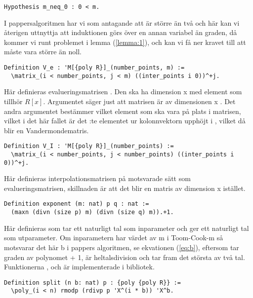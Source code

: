 \begin{lstlisting}
Hypothesis m_neq_0 : 0 < m.
\end{lstlisting}

I pappersalgoritmen har vi som antagande att  är större än två och här kan
vi återigen uttnyttja att induktionen görs över en annan variabel än graden, då
kommer vi runt problemet i lemma (\ref{lemma:1}), och kan vi få ner kravet till
att  måste vara större än noll.

\begin{lstlisting}
Definition V_e : 'M[{poly R}]_(number_points, m) :=
  \matrix_(i < number_points, j < m) ((inter_points i 0))^+j.
\end{lstlisting}

Här definieras evalueringsmatrisen . Den ska ha dimension
 x  med element som tillhör $R[x]$. Argumentet  säger just att matrisen är av dimensionen
 x . Det andra argumentet 
bestämmer vilket element som ska vara på plats  i matrisen, vilket i
det här fallet är det :te elementet ur kolonnvektorn 
upphöjt i , vilket då blir en Vandermondematris.

\begin{lstlisting}
Definition V_I : 'M[{poly R}]_(number_points) :=
  \matrix_(i < number_points, j < number_points) ((inter_points i 0))^+j.
\end{lstlisting}

Här definieras interpolationsmatrisen på motsvarade sätt som
evalueringsmatrisen, skillnaden är att det blir en matris av dimension
 x  istället.

\begin{lstlisting}
Definition exponent (m: nat) p q : nat :=
  (maxn (divn (size p) m) (divn (size q) m)).+1.
\end{lstlisting}

Här definieras  som tar ett naturligt tal  som inparameter och
ger ett naturligt tal som utparameter. Om inparametern har värdet av m i
Toom-Cook-m så motsvarar det här b i pappers algoritmen, se ekvationen
(\ref{eq:b}), eftersom  tar graden av polynomet + 1,  är
heltalsdivision och  tar fram det största av två tal. Funktionerna
,  och  är implementerade i \ssr bibliotek.

\begin{lstlisting}
Definition split (n b: nat) p : {poly {poly R}} :=
  \poly_(i < n) rmodp (rdivp p 'X^(i * b)) 'X^b.
\end{lstlisting}

